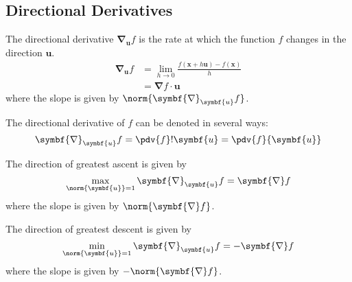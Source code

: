 \documentclass{article}
\begin{document}
\subsection{Directional Derivatives}
\begin{definition}
    The directional derivative \(\symbf{\nabla}_{\symbf{u}}f\) is the
    rate at which the function \(f\) changes in the direction
    \(\symbf{u}\).
    \begin{align*}
        \symbf{\nabla}_{\symbf{u}}f & = \lim_{h \to 0} \frac{f\left( \symbf{x} + h\symbf{u} \right) - f\left( \symbf{x} \right)}{h} \\
                                    & = \symbf{\nabla}f \cdot \symbf{u}
    \end{align*}
    where the slope is given by \(\norm{\symbf{\nabla}_{\symbf{u}}f}\).
\end{definition}
\begin{remark}
    The directional derivative of \(f\) can be denoted in several ways:
    \begin{equation*}
        \symbf{\nabla}_{\symbf{u}}f = \pdv{f}!{\symbf{u}} = \pdv{f}{\symbf{u}}
    \end{equation*}
\end{remark}
\begin{theorem}
    The direction of greatest ascent is given by
    \begin{equation*}
        \max_{\norm{\symbf{u}} = 1} \symbf{\nabla}_{\symbf{u}}f = \symbf{\nabla}f
    \end{equation*}
    where the slope is given by \(\norm{\symbf{\nabla}f}\).
\end{theorem}
\begin{theorem}
    The direction of greatest descent is given by
    \begin{equation*}
        \min_{\norm{\symbf{u}} = 1} \symbf{\nabla}_{\symbf{u}}f = -\symbf{\nabla}f
    \end{equation*}
    where the slope is given by \(-\norm{\symbf{\nabla}f}\).
\end{theorem}
\end{document}
